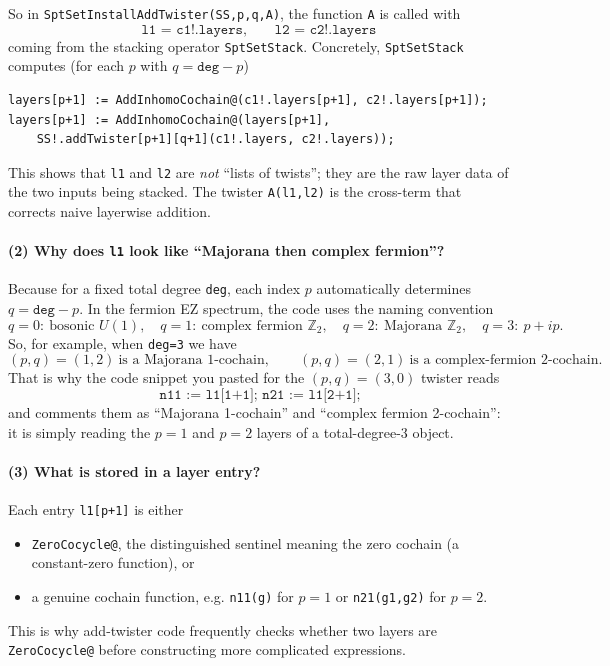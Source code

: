 \documentclass{SciPost}
\begin{document}
So in \texttt{SptSetInstallAddTwister(SS,p,q,A)}, the function \texttt{A} is called with
\begin{equation}
	\texttt{l1 = c1!.layers},\qquad \texttt{l2 = c2!.layers}
\end{equation}
coming from the stacking operator \texttt{SptSetStack}.
Concretely, \texttt{SptSetStack} computes (for each $p$ with $q=\texttt{deg}-p$)
\begin{verbatim}
layers[p+1] := AddInhomoCochain@(c1!.layers[p+1], c2!.layers[p+1]);
layers[p+1] := AddInhomoCochain@(layers[p+1],
    SS!.addTwister[p+1][q+1](c1!.layers, c2!.layers));
\end{verbatim}
This shows that \texttt{l1} and \texttt{l2} are \emph{not} “lists of twists”; they are the raw layer data of the two inputs being stacked.
The twister \texttt{A(l1,l2)} is the cross-term that corrects naive layerwise addition.

\paragraph{(2) Why does \texttt{l1} look like ``Majorana then complex fermion''?}
Because for a fixed total degree \texttt{deg}, each index $p$ automatically determines $q=\texttt{deg}-p$.
In the fermion EZ spectrum, the code uses the naming convention
\begin{equation}
q=0:\ \text{bosonic }U(1),\quad q=1:\ \text{complex fermion }\mathbb{Z}_2,\quad q=2:\ \text{Majorana }\mathbb{Z}_2,\quad q=3:\ p{+}ip.
\end{equation}
So, for example, when \texttt{deg=3} we have
\begin{equation}
(p,q)=(1,2)\ \text{is a Majorana 1-cochain},\qquad (p,q)=(2,1)\ \text{is a complex-fermion 2-cochain}.
\end{equation}
That is why the code snippet you pasted for the $(p,q)=(3,0)$ twister reads
\begin{equation}
	\texttt{n11 := l1[1+1];\ \ n21 := l1[2+1];}
\end{equation}
and comments them as “Majorana 1-cochain” and “complex fermion 2-cochain”: it is simply reading the $p=1$ and $p=2$ layers of a total-degree-$3$ object.

\paragraph{(3) What is stored in a layer entry?}
Each entry \texttt{l1[p+1]} is either
\begin{itemize}
    \item \texttt{ZeroCocycle@}, the distinguished sentinel meaning the zero cochain (a constant-zero function), or
    \item a genuine cochain function, e.g. \texttt{n11(g)} for $p=1$ or \texttt{n21(g1,g2)} for $p=2$.
\end{itemize}
This is why add-twister code frequently checks whether two layers are \texttt{ZeroCocycle@} before constructing more complicated expressions.
\end{document}

